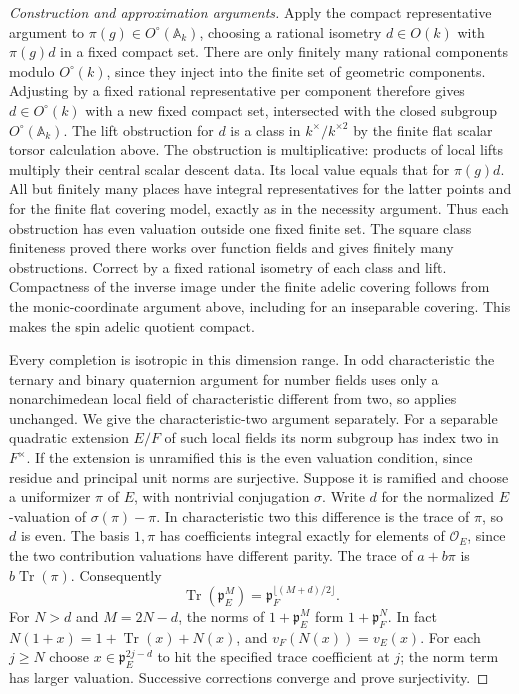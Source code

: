 \documentclass[11pt,a4paper,openany,oneside]{book}
\theoremstyle{resultstyle}
\theoremstyle{definition}
\numberwithin{equation}{chapter}
\begin{document}
\begin{proof}[Construction and approximation arguments]
Apply the compact representative argument to
\(\pi(g)\in O^\circ(\mathbb A_k)\), choosing a rational
isometry \(d\in O(k)\) with \(\pi(g)d\) in a fixed
compact set. There are only finitely many rational
components modulo \(O^\circ(k)\), since they inject
into the finite set of geometric components.
Adjusting by a fixed rational representative per
component therefore gives \(d\in O^\circ(k)\) with a
new fixed compact set, intersected with the closed
subgroup \(O^\circ(\mathbb A_k)\).
The lift obstruction for \(d\)
is a class in \(k^\times/k^{\times2}\) by the
finite flat scalar torsor calculation above.
The obstruction is multiplicative: products of
local lifts multiply their central scalar descent
data. Its local value equals that for \(\pi(g)d\).
All but finitely many places have integral
representatives for the latter points and for the
finite flat covering model, exactly as in the
necessity argument. Thus each obstruction has even
valuation outside one fixed finite set. The square
class finiteness proved there works over function
fields and gives finitely many obstructions. Correct
by a fixed rational isometry of each class and lift.
Compactness of the inverse image under the finite
adelic covering follows from the monic-coordinate
argument above, including for an inseparable
covering. This makes the spin adelic quotient compact.

Every completion is isotropic in this dimension range.
In odd characteristic the ternary and binary
quaternion argument for number fields uses only a
nonarchimedean local field of characteristic different
from two, so applies unchanged. We give the
characteristic-two argument separately. For a
separable quadratic extension \(E/F\) of such local
fields its norm subgroup has index two in \(F^\times\).
If the extension is unramified this is the even
valuation condition, since residue and principal
unit norms are surjective. Suppose it is ramified
and choose a uniformizer \(\pi\) of \(E\), with
nontrivial conjugation \(\sigma\). Write \(d\) for
the normalized \(E\)-valuation of \(\sigma(\pi)-\pi\).
In characteristic two this difference is the trace
of \(\pi\), so \(d\) is even. The basis \(1,\pi\)
has coefficients integral exactly for elements of
\(\mathcal O_E\), since the two contribution valuations
have different parity. The trace of \(a+b\pi\) is
\(b\operatorname{Tr}(\pi)\). Consequently
\[
 \operatorname{Tr}(\mathfrak p_E^M)
   =\mathfrak p_F^{\lfloor(M+d)/2\rfloor}.
\]
For \(N>d\) and \(M=2N-d\), the norms of
\(1+\mathfrak p_E^M\) form \(1+\mathfrak p_F^N\).
In fact \(N(1+x)=1+\operatorname{Tr}(x)+N(x)\),
and \(v_F(N(x))=v_E(x)\). For each \(j\geq N\)
choose \(x\in\mathfrak p_E^{2j-d}\) to hit the
specified trace coefficient at \(j\); the norm term
has larger valuation. Successive corrections
converge and prove surjectivity.


\end{proof}
\end{document}

